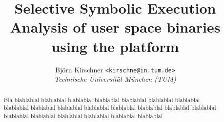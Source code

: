 \documentclass[a4paper,twocolumn]{article}
\title{Selective Symbolic Execution \\ \large Analysis of user space binaries using the \sse platform}
\author{Bj\"{o}rn Kirschner \texttt{<{kirschne}{@}{in.tum.de}>}\\
  \emph{Technische Universit\"{a}t M\"{u}nchen (TUM)}}
\begin{document}
\maketitle

\begin{abstract}
  Bla blablablal blablablal blablablal blablablal blablablal blablablal 
  blablablal blablablal blablablal blablablal blablablal blablablal 
  blablablal blablablal blablablal blablablal blablablal 
  blablablal blablablal blablablal blablablal 
\end{abstract}














\end{document}
